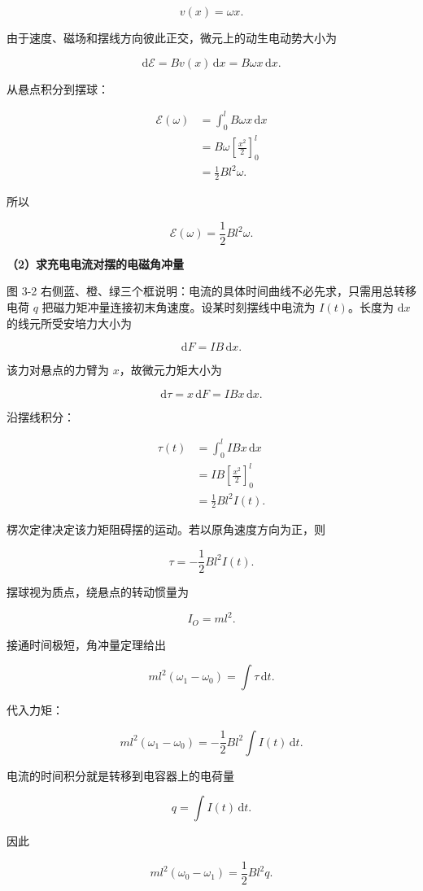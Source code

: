 \documentclass[12pt,a4paper,UTF8]{ctexart}
\begin{document}
\[v(x)=\omega x.\]

由于速度、磁场和摆线方向彼此正交，微元上的动生电动势大小为

\[\mathrm{d}\mathcal E=Bv(x)\,\mathrm{d}x=B\omega x\,\mathrm{d}x.\]

从悬点积分到摆球：

\[
\begin{aligned}
\mathcal E(\omega)
&=\int_0^lB\omega x\,\mathrm{d}x\\
&=B\omega\left[\frac{x^2}{2}\right]_0^l\\
&=\frac12Bl^2\omega.
\end{aligned}
\]

所以

\[
\boxed{\mathcal E(\omega)=\frac12Bl^2\omega}.
\]

\textbf{（2）求充电电流对摆的电磁角冲量}

图 3-2
右侧蓝、橙、绿三个框说明：电流的具体时间曲线不必先求，只需用总转移电荷
\(q\) 把磁力矩冲量连接初末角速度。设某时刻摆线中电流为 \(I(t)\)。长度为
\(\mathrm{d}x\) 的线元所受安培力大小为

\[\mathrm{d}F=IB\,\mathrm{d}x.\]

该力对悬点的力臂为 \(x\)，故微元力矩大小为

\[\mathrm{d}\tau=x\,\mathrm{d}F=IBx\,\mathrm{d}x.\]

沿摆线积分：

\[
\begin{aligned}
\tau(t)
&=\int_0^lIBx\,\mathrm{d}x\\
&=IB\left[\frac{x^2}{2}\right]_0^l\\
&=\frac12Bl^2I(t).
\end{aligned}
\]

楞次定律决定该力矩阻碍摆的运动。若以原角速度方向为正，则

\[\tau=-\frac12Bl^2I(t).\]

摆球视为质点，绕悬点的转动惯量为

\[I_O=ml^2.\]

接通时间极短，角冲量定理给出

\[
ml^2(\omega_1-\omega_0)
=\int\tau\,\mathrm{d}t.
\]

代入力矩：

\[
ml^2(\omega_1-\omega_0)
=-\frac12Bl^2\int I(t)\,\mathrm{d}t.
\]

电流的时间积分就是转移到电容器上的电荷量

\[q=\int I(t)\,\mathrm{d}t.\]

因此

\[
\boxed{
ml^2(\omega_0-\omega_1)=\frac12Bl^2q
}.
\]
\end{document}
